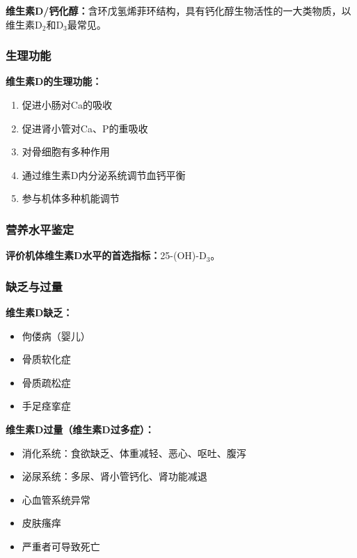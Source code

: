 \begin{defbox}
\textbf{维生素D/钙化醇：}含环戊氢烯菲环结构，具有钙化醇生物活性的一大类物质，以维生素D$_2$和D$_3$最常见。
\end{defbox}

\subsubsection{生理功能}

\begin{keybox}
\textbf{维生素D的生理功能：}
\begin{enumerate}[leftmargin=*]
    \item 促进小肠对Ca的吸收
    \item 促进肾小管对Ca、P的重吸收
    \item 对骨细胞有多种作用
    \item 通过维生素D内分泌系统调节血钙平衡
    \item 参与机体多种机能调节
\end{enumerate}
\end{keybox}

\subsubsection{营养水平鉴定}

\begin{tipbox}
\textbf{评价机体维生素D水平的首选指标：}25-(OH)-D$_3$。
\end{tipbox}

\subsubsection{缺乏与过量}

\begin{tipbox}
\textbf{维生素D缺乏：}
\begin{itemize}[leftmargin=*]
    \item 佝偻病（婴儿）
    \item 骨质软化症
    \item 骨质疏松症
    \item 手足痉挛症
\end{itemize}

\textbf{维生素D过量（维生素D过多症）：}
\begin{itemize}[leftmargin=*]
    \item 消化系统：食欲缺乏、体重减轻、恶心、呕吐、腹泻
    \item 泌尿系统：多尿、肾小管钙化、肾功能减退
    \item 心血管系统异常
    \item 皮肤瘙痒
    \item 严重者可导致死亡
\end{itemize}
\end{tipbox}

